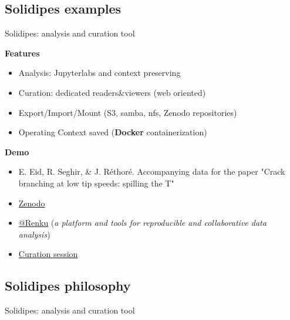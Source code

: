 \documentclass[10pt,compress,serif,aspectratio=169]{beamer}
\begin{document}
\subsection{Solidipes examples}
\begin{frame}{ Solidipes: analysis and curation tool}

\begin{minipage}{.6\textwidth}
  \textbf{Features}
\begin{itemize}
  \item Analysis: Jupyterlabs and context preserving
  \item Curation: dedicated readers\&viewers (web oriented)
  \item Export/Import/Mount (S3, samba, nfs, Zenodo repositories)
  \item Operating Context saved (\textbf{Docker} containerization)
\end{itemize}
\vfill
\textbf{Demo}
\begin{itemize}
  \item {\footnotesize E. Eid, R. Seghir, \& J. Réthoré. Accompanying data for the paper "Crack branching at low tip speeds: spilling the T"}
\item \href{https://doi.org/10.5281/zenodo.8256346}{Zenodo}
\item \href{https://renkulab.io/projects/guillaume.anciaux/jtcam-data-10172}{@Renku} (\textit{a platform and tools for reproducible and collaborative data analysis})
\item \href{https://renkulab.io/projects/guillaume.anciaux/jtcam-data-10172/sessions/new?autostart=1}{Curation session}
\end{itemize}
\end{minipage}
\begin{minipage}{.39\textwidth}
\end{minipage}
\end{frame}

\subsection{Solidipes philosophy}
\begin{frame}{ Solidipes: analysis and curation tool}
\end{frame}
\end{document}

